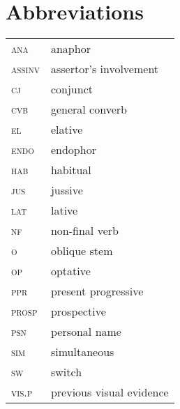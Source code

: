 \documentclass[output=paper]{langsci/langscibook}
\begin{document}
 
\section*{Abbreviations}
\begin{tabularx}{.45\textwidth}{lQ}
\textsc{ana} & anaphor\\
\textsc{assinv} & assertor’s involvement\\
\textsc{cj} & conjunct\\
\textsc{cvb} & general converb\\
\textsc{el} & elative\\
\textsc{endo} & endophor\\
\textsc{hab} & habitual\\
\textsc{jus} & jussive\\ 
\textsc{lat} & lative\\ 
\textsc{nf} & non-final verb\\
\textsc{o} & oblique stem\\
\textsc{op} & optative\\
\textsc{ppr} & present progressive\\
\textsc{prosp} & prospective\\
\textsc{psn} & personal name\\
\textsc{sim} & simultaneous\\
\textsc{sw} & switch\\
\textsc{vis.p} & previous visual evidence\\
\end{tabularx}

\sloppy
\printbibliography[heading=subbibliography,notkeyword=this] 
\end{document}
